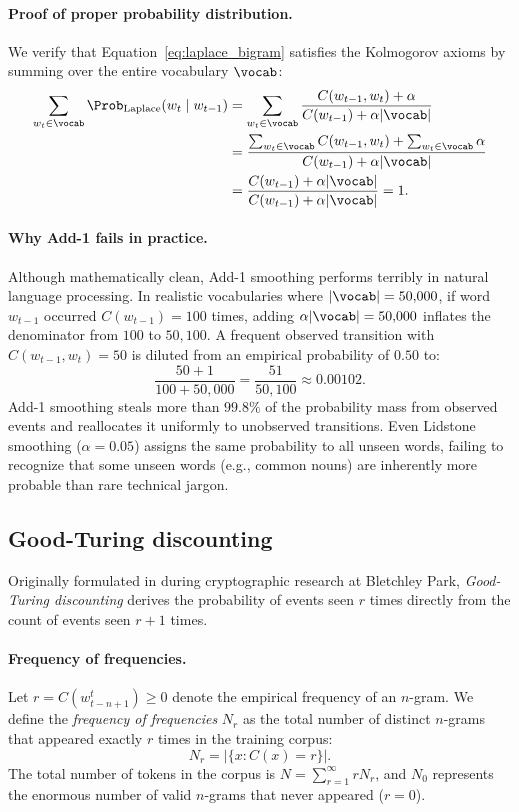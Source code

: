 \documentclass[../../main.tex]{subfiles}
\begin{document}
\paragraph{Proof of proper probability distribution.}
We verify that Equation~\eqref{eq:laplace_bigram} satisfies the Kolmogorov axioms by summing over the entire vocabulary $\vocab$:
\begin{align}
\sum_{w_t \in \vocab} \Prob_{\text{Laplace}}(w_t \mid w_{t-1}) &= \sum_{w_t \in \vocab} \frac{C(w_{t-1}, w_t) + \alpha}{C(w_{t-1}) + \alpha |\vocab|} \notag \\
&= \frac{\sum_{w_t \in \vocab} C(w_{t-1}, w_t) + \sum_{w_t \in \vocab} \alpha}{C(w_{t-1}) + \alpha |\vocab|} \notag \\
&= \frac{C(w_{t-1}) + \alpha |\vocab|}{C(w_{t-1}) + \alpha |\vocab|} = 1. \label{eq:laplace_proof}
\end{align}

\paragraph{Why Add-1 fails in practice.}
Although mathematically clean, Add-1 smoothing performs terribly in natural language processing. In realistic vocabularies where $|\vocab| = 50{,}000$, if word $w_{t-1}$ occurred $C(w_{t-1}) = 100$ times, adding $\alpha |\vocab| = 50{,}000$ inflates the denominator from $100$ to $50{,}100$. A frequent observed transition with $C(w_{t-1}, w_t) = 50$ is diluted from an empirical probability of $0.50$ to:
\[
\frac{50 + 1}{100 + 50{,}000} = \frac{51}{50{,}100} \approx 0.00102.
\]
Add-1 smoothing steals more than $99.8\%$ of the probability mass from observed events and reallocates it uniformly to unobserved transitions. Even Lidstone smoothing ($\alpha = 0.05$) assigns the same probability to all unseen words, failing to recognize that some unseen words (e.g., common nouns) are inherently more probable than rare technical jargon.

\subsection{Good-Turing discounting}
Originally formulated in \cite{good1953} during cryptographic research at Bletchley Park, \emph{Good-Turing discounting} derives the probability of events seen $r$ times directly from the count of events seen $r+1$ times.

\paragraph{Frequency of frequencies.}
Let $r = C(w_{t-n+1}^t) \ge 0$ denote the empirical frequency of an $n$-gram. We define the \emph{frequency of frequencies} $N_r$ as the total number of distinct $n$-grams that appeared exactly $r$ times in the training corpus:
\begin{equation}
\label{eq:gt_nr}
N_r = \left| \{ x : C(x) = r \} \right|.
\end{equation}
The total number of tokens in the corpus is $N = \sum_{r=1}^\infty r N_r$, and $N_0$ represents the enormous number of valid $n$-grams that never appeared ($r=0$).
\end{document}
